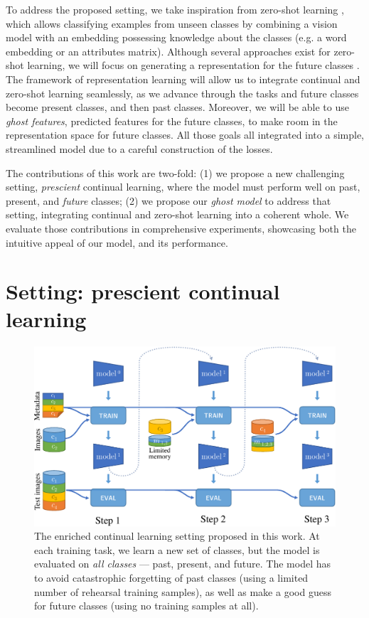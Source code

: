 To address the proposed setting, we take inspiration from zero-shot learning
\cite{lampert2009zeroshot, xian2019awa2}, which allows classifying examples from unseen classes by
combining a vision model with an embedding possessing knowledge about the classes (e.g. a word
embedding \cite{mikolov2013word2vec,pennington2014glove} or an attributes matrix). Although several
approaches exist for zero-shot learning, we will focus on generating a representation for the future
classes \cite{bucher2017zeroshot_gmmn, kumar2018synthesized_zeroshot,
    xian2018feature_generating_zeroshot}. The framework of representation learning will allow us to
integrate continual and zero-shot learning seamlessly, as we advance through the tasks and future
classes become present classes, and then past classes. Moreover, we will be able to use
\textit{ghost features}, predicted features for the future classes, to make room in the
representation space for future classes. All those goals all integrated into a simple, streamlined
model due to a careful construction of the losses.

The contributions of this work are two-fold: (1) we propose a new challenging setting,
\textit{prescient} continual learning, where the model must perform well on past, present, and
\textit{future} classes; (2) we propose our \textit{ghost model} to address that setting,
integrating continual and zero-shot learning into a coherent whole. We evaluate those contributions
in comprehensive experiments, showcasing both the intuitive appeal of our model, and its
performance.


\section{Setting: prescient continual learning}

\label{sec:setting}
\begin{figure}
    \centering
    \includegraphics[width=0.7\linewidth]{images/ghost/protocol.pdf}
    \caption{The enriched continual learning setting proposed in this work. At each training task,
        we learn a new set of classes, but the model is evaluated on \textit{all classes} --- past,
        present, and future. The model has to avoid catastrophic forgetting of past classes (using a
        limited number of rehearsal training samples), as well as make a good guess for future classes
        (using no training samples at all).}
    \label{fig:protocol_zeroshot_continual}
\end{figure}


